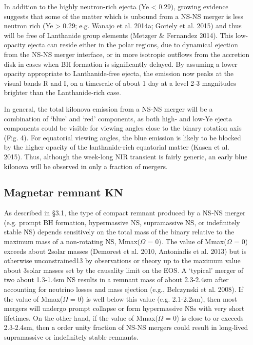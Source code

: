 In addition to the highly neutron-rich ejecta (Ye < 0.29), growing evidence suggests that some of the matter which is unbound from a NS-NS merger is less neutron rich (Ye > 0.29; e.g. Wanajo et al. 2014a; Goriely et al. 2015) and thus will be free of Lanthanide group elements (Metzger \& Fernandez 2014). This low-opacity ejecta can reside either in the polar regions, due to dynamical ejection from the NS-NS merger interface, or in more isotropic outflows from the accretion disk in cases when BH formation is significantly delayed.
By assuming a lower opacity appropriate to Lanthanide-free ejecta, the emission now peaks at the visual bands R and I, on a timescale of about 1 day at a level 2-3 magnitudes brighter than the Lanthanide-rich case.

In general, the total kilonova emission from a NS-NS merger will be a combination of `blue' and `red' components, as both high- and low-Ye ejecta components could be visible for viewing angles close to the binary rotation axis (Fig. 4). For equatorial viewing angles, the blue emission is likely to be blocked by the higher opacity of the lanthanide-rich equatorial matter (Kasen et al. 2015). Thus, although the week-long NIR transient is fairly generic, an early blue kilonova will be observed in only a fraction of mergers.

\subsection{Magnetar remnant KN}

As described in §3.1, the type of compact remnant produced by a NS-NS merger (e.g. prompt BH formation, hypermassive NS, supramassive NS, or indefinitely stable NS) depends sensitively on the total mass of the binary relative to the maximum mass of a non-rotating NS, Mmax($\Omega$ = 0). The value of Mmax($\Omega$ = 0) exceeds about 2solar masses (Demorest et al. 2010, Antoniadis et al. 2013) but is otherwise unconstrained13 by observations or theory up to the maximum value about 3solar masses set by the causality limit on the EOS. A `typical' merger of two about 1.3-1.4sm NS results in a remnant mass of about 2.3-2.4sm after accounting for neutrino losses and mass ejection (e.g., Belczynski et al. 2008). If the value of Mmax($\Omega$ = 0) is well below this value (e.g. 2.1-2.2sm), then most mergers will undergo prompt collapse or form hypermassive NSs with very short lifetimes. On the other hand, if the value of Mmax($\Omega$ = 0) is close to or exceeds 2.3-2.4sm, then a order unity fraction of NS-NS mergers could result in long-lived supramassive or indefinitely stable remnants.

